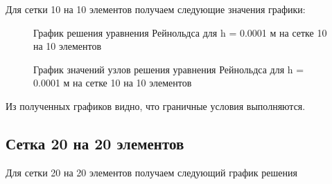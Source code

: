 \documentclass[12pt, a4paper]{article}
\begin{document}
Для сетки 10 на 10 элементов получаем следующие значения графики:

\begin{figure}[!htbp]
	\caption{График решения уравнения Рейнольдса для h = 0.0001 м на сетке 10 на 10 элементов}
	\label{10x10mesh}
\end{figure}
\begin{figure}[!htbp]
		\caption{График значений узлов решения уравнения Рейнольдса для h = 0.0001 м на сетке 10 на 10 элементов}
	\label{10x10points}
\end{figure}

Из полученных графиков видно, что граничные условия выполняются.

\newpage

\subsection{Сетка 20 на 20 элементов}

Для сетки 20 на 20 элементов получаем следующий   график решения
\end{document}
